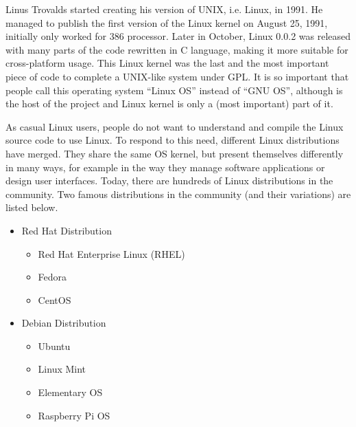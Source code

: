 Linus Trovalds started creating his version of UNIX, i.e. Linux, in 1991. He managed to publish the first version of the Linux kernel on August 25, 1991, initially only worked for 386 processor. Later in October, Linux 0.0.2 was released with many parts of the code rewritten in C language, making it more suitable for cross-platform usage. This Linux kernel was the last and the most important piece of code to complete a UNIX-like system under GPL. It is so important that people call this operating system ``Linux OS'' instead of ``GNU OS'', although is the host of the project and Linux kernel is only a (most important) part of it.

As casual Linux users, people do not want to understand and compile the Linux source code to use Linux. To respond to this need, different Linux distributions have merged. They share the same OS kernel, but present themselves differently in many ways, for example in the way they manage software applications or design user interfaces. Today, there are hundreds of Linux distributions in the community. Two famous distributions in the community (and their variations) are listed below.
\begin{itemize}
  \item Red Hat Distribution
  \begin{itemize}
    \item Red Hat Enterprise Linux (RHEL)
    \item Fedora
    \item CentOS
  \end{itemize}
  \item Debian Distribution
  \begin{itemize}
    \item Ubuntu
    \item Linux Mint
    \item Elementary OS
    \item Raspberry Pi OS
  \end{itemize}
\end{itemize}






















